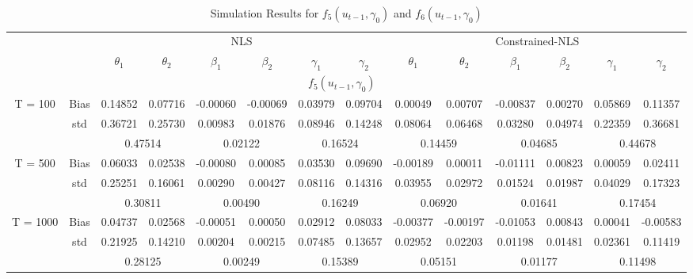 \documentclass[a4paper,12pt,times,numbered,print,index]{report}
\numberwithin{equation}{section}
\begin{document}
	\begin{table}[htbp]
		\centering
		\caption{Simulation Results for $f_5 (u_{t-1}, \gamma_0)$ and $f_6 (u_{t-1}, \gamma_0)$}
		\begin{adjustbox}{max width=\textwidth}
			\begin{tabular}{cccccccccccccc}
				\toprule
				&       & \multicolumn{6}{c}{NLS}                       & \multicolumn{6}{c}{Constrained-NLS} \\
				&       & $\theta_1$ & $\theta_2$ & $\beta_1$ & $\beta_2$ & $\gamma_1$ & $\gamma_2$ & $\theta_1$ & $\theta_2$ & $\beta_1$ & $\beta_2$ & $\gamma_1$ & $\gamma_2$ \\
				\midrule
				&       & \multicolumn{10}{c}{$f_5 (u_{t-1}, \gamma_0)$}                \\
				\midrule
				\multirow{3}[1]{*}{T = 100} & Bias  & 0.14852 & 0.07716 & -0.00060 & -0.00069 & 0.03979 & 0.09704 & 0.00049 & 0.00707 & -0.00837 & 0.00270 & 0.05869 & 0.11357 \\
				& std   & 0.36721 & 0.25730 & 0.00983 & 0.01876 & 0.08946 & 0.14248 & 0.08064 & 0.06468 & 0.03280 & 0.04974 & 0.22359 & 0.36681 \\
				&       & \multicolumn{2}{c}{0.47514} & \multicolumn{2}{c}{0.02122} & \multicolumn{2}{c}{0.16524} & \multicolumn{2}{c}{0.14459} & \multicolumn{2}{c}{0.04685} & \multicolumn{2}{c}{0.44678} \\
				\multirow{3}[0]{*}{T = 500} & Bias  & 0.06033 & 0.02538 & -0.00080 & 0.00085 & 0.03530 & 0.09690 & -0.00189 & 0.00011 & -0.01111 & 0.00823 & 0.00059 & 0.02411 \\
				& std   & 0.25251 & 0.16061 & 0.00290 & 0.00427 & 0.08116 & 0.14316 & 0.03955 & 0.02972 & 0.01524 & 0.01987 & 0.04029 & 0.17323 \\
				&       & \multicolumn{2}{c}{0.30811} & \multicolumn{2}{c}{0.00490} & \multicolumn{2}{c}{0.16249} & \multicolumn{2}{c}{0.06920} & \multicolumn{2}{c}{0.01641} & \multicolumn{2}{c}{0.17454} \\
				\multirow{3}[1]{*}{T = 1000} & Bias  & 0.04737 & 0.02568 & -0.00051 & 0.00050 & 0.02912 & 0.08033 & -0.00377 & -0.00197 & -0.01053 & 0.00843 & 0.00041 & -0.00583 \\
				& std   & 0.21925 & 0.14210 & 0.00204 & 0.00215 & 0.07485 & 0.13657 & 0.02952 & 0.02203 & 0.01198 & 0.01481 & 0.02361 & 0.11419 \\
				&       & \multicolumn{2}{c}{0.28125} & \multicolumn{2}{c}{0.00249} & \multicolumn{2}{c}{0.15389} & \multicolumn{2}{c}{0.05151} & \multicolumn{2}{c}{0.01177} & \multicolumn{2}{c}{0.11498} \\

\end{tabular}
\end{adjustbox}
\end{table}
\end{document}
